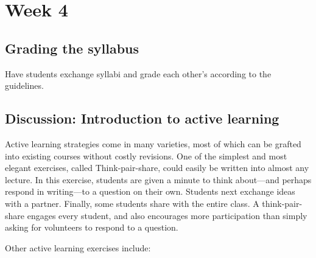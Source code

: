 
\section{Week 4}
\label{sec:week-4}

\subsection{Grading the syllabus}
\label{sec:grading-syllabus}

Have students exchange syllabi and grade each other's according to the guidelines.

\subsection{Discussion: Introduction to active learning}
\label{sec:discussion}

Active learning strategies come in many varieties, most of which can be grafted into existing courses without costly revisions. One of the simplest and most elegant exercises, called Think-pair-share, could easily be written into almost any lecture. In this exercise, students are given a minute to think about—and perhaps respond in writing—to a question on their own.  Students next exchange ideas with a partner.  Finally, some students share with the entire class. A think-pair-share engages every student, and also encourages more participation than simply asking for volunteers to respond to a question.

Other active learning exercises include:

